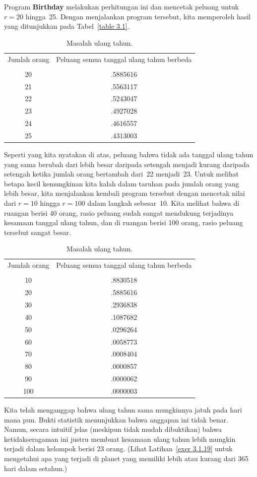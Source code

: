 \begin{example}
Program {\bf Birthday} melakukan perhitungan ini dan mencetak
peluang untuk $r = 20$ hingga~25.  Dengan menjalankan program tersebut, kita memperoleh
hasil yang ditunjukkan pada Tabel~\ref{table
3.1}.
\begin{table}
\centering
\begin{tabular}{cc} Jumlah orang     & Peluang semua tanggal ulang tahun
berbeda \\ 
\\
20 & .5885616 \\ 21 & .5563117 \\ 22 & .5243047 \\ 23 & .4927028 \\
24 & .4616557 \\ 25 & .4313003 \\ 
\end{tabular}
\caption{Masalah ulang tahun.}
\label{table 3.1}
\end{table}
Seperti yang kita nyatakan di atas, peluang bahwa tidak ada tanggal ulang tahun yang
sama berubah dari lebih besar daripada setengah menjadi kurang daripada setengah ketika
jumlah orang bertambah dari~22 menjadi~23.  Untuk melihat betapa kecil kemungkinan kita
kalah dalam taruhan pada jumlah orang yang lebih besar, kita menjalankan kembali program
tersebut dengan mencetak nilai dari $r = 10$ hingga $r = 100$ dalam langkah sebesar~10.
Kita melihat bahwa di ruangan berisi 40 orang, rasio peluang sudah sangat mendukung
terjadinya kesamaan tanggal ulang tahun, dan di ruangan berisi 100 orang, rasio peluang
tersebut sangat besar.
\begin{table}
\centering
\begin{tabular}{cc} Jumlah orang     & Peluang semua tanggal ulang tahun
berbeda \\ 
\\
10 & .8830518 \\ 20 & .5885616 \\ 30 & .2936838 \\ 40 & .1087682 \\
50 & .0296264 \\ 60 & .0058773 \\ 70 & .0008404 \\ 80 & .0000857 \\ 90 & .0000062 \\
100 & .0000003 \\ 
\end{tabular}
\caption{Masalah ulang tahun.}
\label{table 3.2}
\end{table}
Kita telah menganggap bahwa ulang tahun sama mungkinnya jatuh pada hari mana pun.
Bukti statistik menunjukkan bahwa anggapan ini tidak benar.  Namun, secara intuitif
jelas (meskipun tidak mudah dibuktikan) bahwa ketidakseragaman ini justru membuat
kesamaan ulang tahun lebih mungkin terjadi dalam kelompok berisi 23 orang.  (Lihat
Latihan~\ref{exer 3.1.19} untuk mengetahui apa yang terjadi di planet yang memiliki
lebih atau kurang dari 365 hari dalam setahun.)
\end{example}

